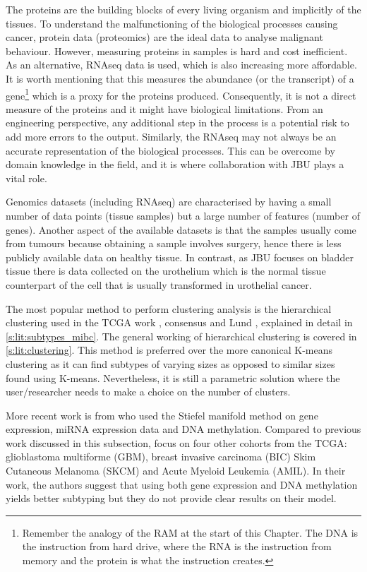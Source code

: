 The proteins are the building blocks of every living organism and implicitly of the tissues. To understand the malfunctioning of the biological processes causing cancer, protein data (proteomics) are the ideal data to analyse malignant behaviour. However, measuring proteins in samples is hard and cost inefficient. As an alternative, RNAseq data is used, which is also increasing more affordable. It is worth mentioning that this measures the abundance (or the transcript) of a gene\footnote{Remember the analogy of the RAM at the start of this Chapter. The DNA is the instruction from hard drive, where the RNA is the instruction from memory and the protein is what the instruction creates.} which is a proxy for the proteins produced. Consequently, it is not a direct measure of the proteins and it might have biological limitations. From an engineering perspective, any additional step in the process is a potential risk to add more errors to the output. Similarly, the RNAseq may not always be an accurate representation of the biological processes. This can be overcome by domain knowledge in the field, and it is where collaboration with JBU plays a vital role.

Genomics datasets (including RNAseq) are characterised by having a small number of data points (tissue samples) but a large number of features (number of genes). Another aspect of the available datasets is that the samples usually come from tumours because obtaining a sample involves surgery, hence there is less publicly available data on healthy tissue. In contrast, as JBU focuses on bladder tissue there is data collected on the urothelium which is the normal tissue counterpart of the cell that is usually transformed in urothelial cancer.

The most popular method to perform clustering analysis is the hierarchical clustering used in the TCGA work \cite{Robertson2017-mg}, consensus \citet{Kamoun2020-tj} and Lund \cite{Sjodahl2017-xr}, explained in detail in \cref{s:lit:subtypes_mibc}. The general working of hierarchical clustering is covered in \cref{s:lit:clustering}. This method is preferred over the more canonical K-means clustering as it can find subtypes of varying sizes as opposed to similar sizes found using K-means. Nevertheless, it is still a parametric solution where the user/researcher needs to make a choice on the number of clusters.

More recent work is from \citet{Tian2021-vu} who used the Stiefel manifold method on gene expression, miRNA expression data and DNA methylation. Compared to previous work discussed in this subsection, \citet{Tian2021-vu} focus on four other cohorts from the TCGA: glioblastoma multiforme (GBM), breast invasive carcinoma (BIC) Skim Cutaneous Melanoma (SKCM) and Acute Myeloid Leukemia (AMIL). In their work, the authors suggest that using both gene expression and DNA methylation yields better subtyping but they do not provide clear results on their model.

